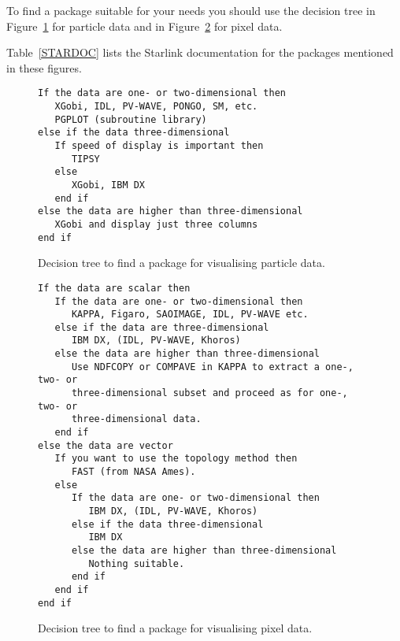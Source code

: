 To find a package suitable for your needs you should use the decision
tree in Figure~\ref{DECPART} for particle data and in
Figure~\ref{DECPIX} for pixel data. 
\begin{latex}
Table~\ref{STARDOC} lists the Starlink documentation for the packages
mentioned in these figures.
\end{latex}

\begin{figure}[htbp]

\begin{verbatim}
If the data are one- or two-dimensional then
   XGobi, IDL, PV-WAVE, PONGO, SM, etc.
   PGPLOT (subroutine library)
else if the data three-dimensional
   If speed of display is important then
      TIPSY
   else
      XGobi, IBM DX
   end if
else the data are higher than three-dimensional
   XGobi and display just three columns
end if
\end{verbatim}

\caption[Decision tree to find a package for visualising particle 
data.]{Decision tree to find a package for visualising particle data.
\label{DECPART} }

\end{figure}


\begin{figure}[htbp]


\begin{verbatim}
If the data are scalar then
   If the data are one- or two-dimensional then
      KAPPA, Figaro, SAOIMAGE, IDL, PV-WAVE etc.
   else if the data are three-dimensional
      IBM DX, (IDL, PV-WAVE, Khoros)
   else the data are higher than three-dimensional
      Use NDFCOPY or COMPAVE in KAPPA to extract a one-, two- or
      three-dimensional subset and proceed as for one-, two- or
      three-dimensional data.
   end if
else the data are vector
   If you want to use the topology method then
      FAST (from NASA Ames).
   else
      If the data are one- or two-dimensional then
         IBM DX, (IDL, PV-WAVE, Khoros)
      else if the data three-dimensional
         IBM DX
      else the data are higher than three-dimensional
         Nothing suitable.
      end if
   end if
end if
\end{verbatim}

\caption[Decision tree to find a package for visualising pixel 
data.]{Decision tree to find a package for visualising pixel data.
\label{DECPIX} }

\end{figure}


